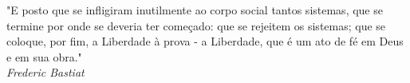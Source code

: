 \begin{titlepage}
 \vspace*{5cm}
 \begin{flushright}
  "E posto que se infligiram inutilmente ao corpo social tantos sistemas,
    que se termine por onde se deveria ter começado: que se rejeitem os
    sistemas; que se coloque, por fim, a Liberdade à prova - a Liberdade,
    que é um ato de fé em Deus e em sua obra."\\\textit{Frederic Bastiat}
  \vspace{1cm}
 \end{flushright}
\end{titlepage}
